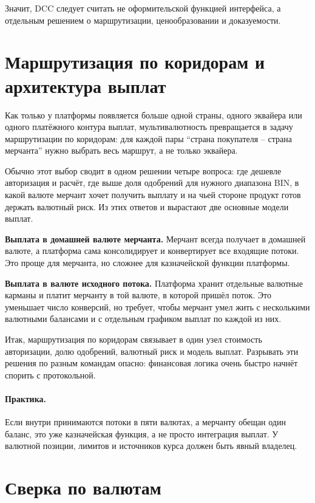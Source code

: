 Значит, DCC следует считать не оформительской функцией интерфейса,
а отдельным решением о маршрутизации, ценообразовании
и доказуемости.

\section{Маршрутизация по коридорам и архитектура выплат}
\label{sec:mc-routing}

Как только у платформы появляется больше одной страны, одного
эквайера или одного платёжного контура выплат, мультивалютность
превращается в задачу маршрутизации по коридорам: для каждой пары
\enquote{страна покупателя -- страна мерчанта} нужно выбрать
весь маршрут, а не только эквайера.

Обычно этот выбор сводит в одном решении четыре вопроса:
где дешевле авторизация и расчёт, где выше доля одобрений
для нужного диапазона BIN, в какой валюте мерчант хочет получить
выплату и на чьей стороне продукт готов держать валютный риск.
Из этих ответов и вырастают две основные модели выплат.

\textbf{Выплата в домашней валюте мерчанта.} Мерчант всегда получает
в домашней валюте, а платформа сама консолидирует и конвертирует
все входящие потоки. Это проще для мерчанта, но сложнее
для казначейской функции платформы.

\textbf{Выплата в валюте исходного потока.} Платформа хранит
отдельные валютные карманы и платит мерчанту в той валюте,
в которой пришёл поток. Это уменьшает число конверсий,
но требует, чтобы мерчант умел жить с несколькими валютными
балансами и с отдельным графиком выплат по каждой из них.

Итак, маршрутизация по коридорам связывает в один узел
стоимость авторизации, долю одобрений, валютный риск
и модель выплат. Разрывать эти решения по разным командам
опасно: финансовая логика очень быстро начнёт спорить
с протокольной.

\paragraph{Практика.}
Если внутри принимаются потоки в пяти валютах, а мерчанту обещан один баланс, это уже казначейская функция, а не просто интеграция выплат. У валютной позиции, лимитов и источников курса должен быть явный владелец.


\section{Сверка по валютам}
\label{sec:mc-fx-risk}

